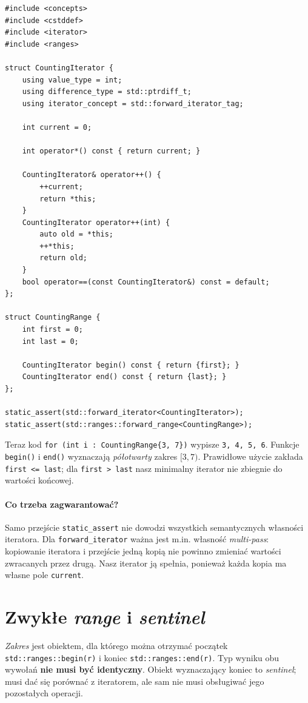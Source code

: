\begin{lstlisting}
#include <concepts>
#include <cstddef>
#include <iterator>
#include <ranges>

struct CountingIterator {
    using value_type = int;
    using difference_type = std::ptrdiff_t;
    using iterator_concept = std::forward_iterator_tag;

    int current = 0;

    int operator*() const { return current; }

    CountingIterator& operator++() {
        ++current;
        return *this;
    }
    CountingIterator operator++(int) {
        auto old = *this;
        ++*this;
        return old;
    }
    bool operator==(const CountingIterator&) const = default;
};

struct CountingRange {
    int first = 0;
    int last = 0;

    CountingIterator begin() const { return {first}; }
    CountingIterator end() const { return {last}; }
};

static_assert(std::forward_iterator<CountingIterator>);
static_assert(std::ranges::forward_range<CountingRange>);
\end{lstlisting}

Teraz kod \texttt{for (int i : CountingRange\{3, 7\})} wypisze
\texttt{3, 4, 5, 6}. Funkcje \texttt{begin()} i \texttt{end()}
wyznaczają \emph{półotwarty} zakres \([3,7)\). Prawidłowe użycie
zakłada \texttt{first <= last}; dla \texttt{first > last} nasz
minimalny iterator nie zbiegnie do wartości końcowej.

\paragraph{Co trzeba zagwarantować?}
Samo przejście \texttt{static\_assert} nie dowodzi wszystkich
semantycznych własności iteratora. Dla \texttt{forward\_iterator}
ważna jest m.in. własność \emph{multi-pass}: kopiowanie iteratora
i przejście jedną kopią nie powinno zmieniać wartości zwracanych
przez drugą. Nasz iterator ją spełnia, ponieważ każda kopia ma własne
pole \texttt{current}.

\section{Zwykłe \textit{range} i \textit{sentinel}}
\label{sec:cpp8-range-sentinel}

\emph{Zakres} jest obiektem, dla którego można otrzymać początek
\texttt{std::ranges::begin(r)} i koniec \texttt{std::ranges::end(r)}.
Typ wyniku obu wywołań \textbf{nie musi być identyczny}. Obiekt
wyznaczający koniec to \emph{sentinel}; musi dać się porównać z
iteratorem, ale sam nie musi obsługiwać jego pozostałych operacji.

